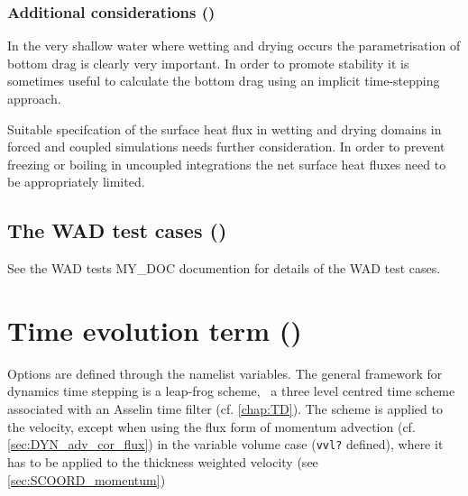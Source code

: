\documentclass[../main/NEMO_manual]{subfiles}
\begin{document}
\subsubsection[Additional considerations (\textit{usrdef\_zgr.F90})]{Additional considerations ()}
\label{subsec:DYN_WAD_additional}

In the very shallow water where wetting and drying occurs the parametrisation of
bottom drag is clearly very important. In order to promote stability
it is sometimes useful to calculate the bottom drag using an implicit time-stepping approach.

Suitable specifcation of the surface heat flux in wetting and drying domains in forced and
coupled simulations needs further consideration. In order to prevent freezing or boiling
in uncoupled integrations the net surface heat fluxes need to be appropriately limited.

\subsection[The WAD test cases (\textit{usrdef\_zgr.F90})]{The WAD test cases ()}
\label{subsec:DYN_WAD_test_cases}

See the WAD tests MY\_DOC documention for details of the WAD test cases.

\section[Time evolution term (\textit{dynnxt.F90})]{Time evolution term (\protect{})}
\label{sec:DYN_nxt}

Options are defined through the  namelist variables.
The general framework for dynamics time stepping is a leap-frog scheme,
\ie\ a three level centred time scheme associated with an Asselin time filter (cf. \autoref{chap:TD}).
The scheme is applied to the velocity, except when
using the flux form of momentum advection (cf. \autoref{sec:DYN_adv_cor_flux})
in the variable volume case (\texttt{vvl?} defined),
where it has to be applied to the thickness weighted velocity (see \autoref{sec:SCOORD_momentum})
\end{document}
